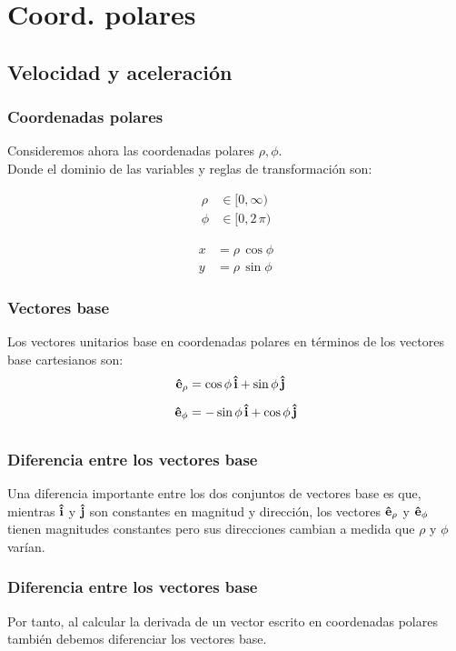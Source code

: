 \documentclass[12pt]{beamer}
\begin{document}
\section{Coord. polares}
\subsection{Velocidad y aceleración}

\begin{frame}
\frametitle{Coordenadas polares}
Consideremos ahora las coordenadas polares $\rho, \phi$.
\\
\bigskip
\pause
Donde el dominio de las variables y reglas de transformación son:
\\
\begin{minipage}{0.4\textwidth}
\begin{align*}
\rho &\in [0,\infty) \\[0.5em]
\phi &\in [0, 2 \, \pi) 
\end{align*}
\end{minipage}
\hspace{1cm}
\begin{minipage}{0.4\textwidth}
\begin{align*}
x &= \rho \, \cos \phi \\[0.5em]
y &= \rho \, \sin \phi
\end{align*}
\end{minipage}
\end{frame}
\begin{frame}
\frametitle{Vectores base}
Los vectores unitarios base en coordenadas polares en términos de los vectores base cartesianos son:
\begin{align*}
\vu{e}_{\rho} &= \cos \phi \, \vu{i} + \sin \phi \, \vu{j} \\[0.5em]
\vu{e}_{\phi} &= -\sin \phi \, \vu{i} + \cos \phi \, \vu{j} \\[0.5em]
\end{align*}
\end{frame}
\begin{frame}
\frametitle{Diferencia entre los vectores base}
Una diferencia importante entre los dos conjuntos de vectores base es que, mientras $\vu{i}$ y $\vu{j}$ son constantes en magnitud y dirección, los vectores $\vu{e}_{\rho}$ y $\vu{e}_{\phi}$ tienen magnitudes constantes pero sus direcciones cambian a medida que $\rho$ y $\phi$ varían.
\end{frame}
\begin{frame}
\frametitle{Diferencia entre los vectores base}
Por tanto, al calcular la derivada de un vector escrito en coordenadas polares también debemos diferenciar los vectores base.
\end{frame}
\end{document}
